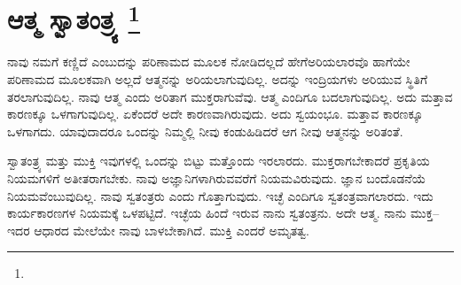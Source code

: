 
\chapter[ಆತ್ಮ ಸ್ವಾತಂತ್ರ್ಯ ]{ಆತ್ಮ ಸ್ವಾತಂತ್ರ್ಯ \protect\footnote{}}

ನಾವು ನಮಗೆ ಕಣ್ಣಿದೆ ಎಂಬುದನ್ನು ಪರಿಣಾಮದ ಮೂಲಕ ನೋಡಿದಲ್ಲದೆ ಹೇಗೆ\break ಅರಿಯಲಾರವೊ ಹಾಗೆಯೇ ಪರಿಣಾಮದ ಮೂಲಕವಾಗಿ ಅಲ್ಲದೆ ಆತ್ಮನನ್ನು ಅರಿಯಲಾಗುವುದಿಲ್ಲ. ಅದನ್ನು ಇಂದ್ರಿಯಗಳು ಅರಿಯುವ ಸ್ಥಿತಿಗೆ ತರಲಾಗುವುದಿಲ್ಲ. ನಾವು ಆತ್ಮ ಎಂದು ಅರಿತಾಗ ಮುಕ್ತರಾಗುವೆವು. ಆತ್ಮ ಎಂದಿಗೂ ಬದಲಾಗುವುದಿಲ್ಲ. ಅದು ಮತ್ತಾವ ಕಾರಣಕ್ಕೂ ಒಳಗಾಗುವುದಿಲ್ಲ. ಏಕೆಂದರೆ ಅದೇ ಕಾರಣವಾಗಿರುವುದು. ಅದು ಸ್ವಯಂಭೂ. ಮತ್ತಾವ ಕಾರಣಕ್ಕೂ ಒಳಗಾಗದು. ಯಾವುದಾದರೂ ಒಂದನ್ನು ನಿಮ್ಮಲ್ಲಿ ನೀವು ಕಂಡು\break ಹಿಡಿದರೆ ಆಗ ನೀವು ಆತ್ಮನನ್ನು ಅರಿತಂತೆ.

ಸ್ವಾತಂತ್ರ್ಯ ಮತ್ತು ಮುಕ್ತಿ ಇವುಗಳಲ್ಲಿ ಒಂದನ್ನು ಬಿಟ್ಟು ಮತ್ತೊಂದು ಇರಲಾರದು. ಮುಕ್ತರಾಗಬೇಕಾದರೆ ಪ್ರಕೃತಿಯ ನಿಯಮಗಳಿಗೆ ಅತೀತರಾಗಬೇಕು. ನಾವು ಅಜ್ಞಾನಿಗಳಾಗಿರುವವರೆಗೆ ನಿಯಮವಿರುವುದು. ಜ್ಞಾನ ಬಂದೊಡನೆಯೆ ನಿಯಮವೆಂಬುವುದಿಲ್ಲ. ನಾವು ಸ್ವತಂತ್ರರು ಎಂದು ಗೊತ್ತಾಗುವುದು. ಇಚ್ಛೆ ಎಂದಿಗೂ ಸ್ವತಂತ್ರವಾಗಲಾರದು. ಇದು ಕಾರ್ಯಕಾರಣಗಳ ನಿಯಮಕ್ಕೆ ಒಳಪಟ್ಟಿದೆ. ಇಚ್ಛೆಯ ಹಿಂದೆ ಇರುವ ನಾನು ಸ್ವತಂತ್ರನು. ಅದೇ ಆತ್ಮ. ನಾನು ಮುಕ್ತ–ಇದರ ಆಧಾರದ ಮೇಲೆಯೇ ನಾವು ಬಾಳಬೇಕಾಗಿದೆ. ಮುಕ್ತಿ ಎಂದರೆ ಅಮೃತತ್ವ.

